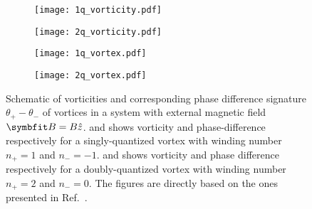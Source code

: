 \begin{figure}[h]
    \newcommand{\fractionwidth}{.38}
    \centering
    \begin{subfigure}[b]{\fractionwidth\textwidth}
        \centering
        \texttt{[image: 1q\_vorticity.pdf]}
        \caption{\label{fig:Vor:schematic:1q:v}}
    \end{subfigure}
    \hspace{2em}
    \begin{subfigure}[b]{\fractionwidth\textwidth}
        \centering
        \texttt{[image: 2q\_vorticity.pdf]}
        \caption{\label{fig:Vor:schematic:2q:v}}
    \end{subfigure}

    \begin{subfigure}[b]{\fractionwidth\textwidth}
        \centering
        \texttt{[image: 1q\_vortex.pdf]}
        \caption{\label{fig:Vor:schematic:1q:pd}}
    \end{subfigure}
    \hspace{2em}
    \begin{subfigure}[b]{\fractionwidth\textwidth}
        \centering
        \texttt{[image: 2q\_vortex.pdf]}
        \caption{\label{fig:Vor:schematic:2q:pd}}
    \end{subfigure}
    \caption{Schematic of vorticities and corresponding phase difference signature $\theta_+-\theta_-$ of vortices in a system with external magnetic field $\v{B} = B\hat{z}$. 
     \protect{} and \protect{} shows vorticity and phase-difference respectively for a 
     singly-quantized vortex with winding number $n_+=1$ and $n_-=-1$.
     \protect{} and \protect{} shows vorticity and phase difference respectively for a doubly-quantized vortex with winding number $n_+=2$ and $n_-=0$. The figures are directly based on the ones presented in Ref.~\cite{AsleGaraud16}.}
    \label{fig:Vor:schematic}
\end{figure}




